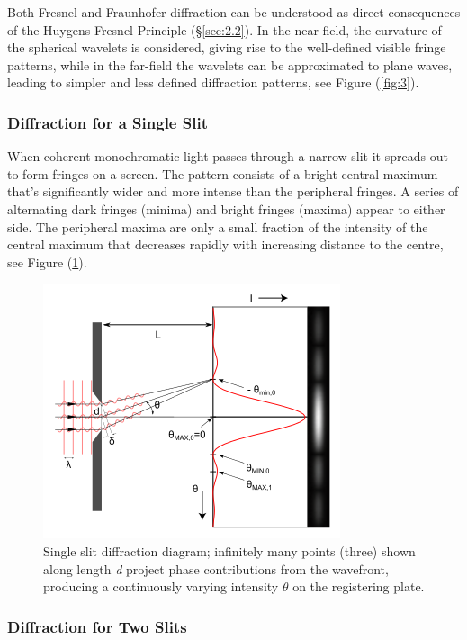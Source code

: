 \documentclass[12pt]{article}
\begin{document}
Both Fresnel and Fraunhofer diffraction can be understood as direct consequences of the Huygens-Fresnel Principle (§\ref{sec:2.2}). In the near-field, the curvature of the spherical wavelets is considered, giving rise
to the well-defined visible fringe patterns, while in the far-field the wavelets can be approximated to plane waves, leading to simpler and less defined diffraction patterns, see Figure (\ref{fig:3}). \cite{hecht2012optics}

\subsubsection{Diffraction for a Single Slit} \label{sec:2.3.2}

When coherent monochromatic light passes through a narrow slit it spreads out to form fringes on a screen. The pattern consists of a bright central maximum that's significantly wider and more intense
than the peripheral fringes. A series of alternating dark fringes (minima) and bright fringes (maxima) appear to either side. The peripheral maxima are only a small fraction of the intensity of the central maximum
that decreases rapidly with increasing distance to the centre, see Figure (\ref{fig:4}). \cite{hecht2012optics,Born_Wolf_Bhatia_Clemmow_Gabor_Stokes_Taylor_Wayman_Wilcock_1999,openstax3}

\begin{figure}[H]
    \centering
    \includegraphics[width=.45\textwidth]{Single_Slit_Diffraction.png}
    \caption{Single slit diffraction diagram; infinitely many points (three) shown along length \textit{d} project phase contributions from the wavefront, producing a continuously varying intensity \( \theta \) on the registering plate. \cite{enwiki:1313573322}}
    \label{fig:4}
\end{figure}

\subsubsection{Diffraction for Two Slits} \label{sec:2.3.3}
\end{document}
